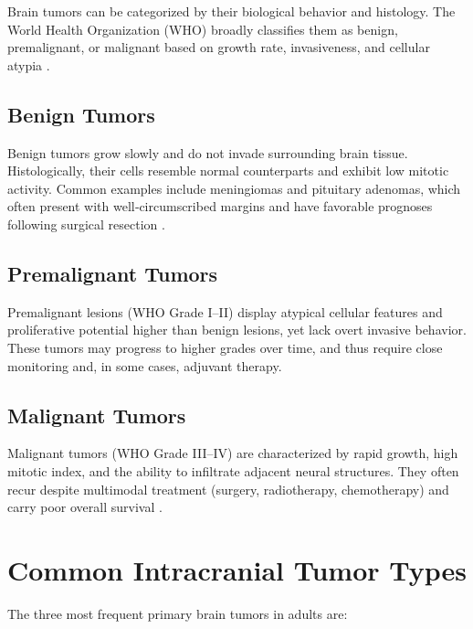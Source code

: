 Brain tumors can be categorized by their biological behavior and histology. The World Health Organization (WHO) broadly classifies them as benign, premalignant, or malignant based on growth rate, invasiveness, and cellular atypia \cite{ref8}.

\subsection{Benign Tumors}
Benign tumors grow slowly and do not invade surrounding brain tissue. Histologically, their cells resemble normal counterparts and exhibit low mitotic activity. Common examples include meningiomas and pituitary adenomas, which often present with well‐circumscribed margins and have favorable prognoses following surgical resection \cite{ref8}.

\subsection{Premalignant Tumors}
Premalignant lesions (WHO Grade I–II) display atypical cellular features and proliferative potential higher than benign lesions, yet lack overt invasive behavior. These tumors may progress to higher grades over time, and thus require close monitoring and, in some cases, adjuvant therapy.

\subsection{Malignant Tumors}
Malignant tumors (WHO Grade III–IV) are characterized by rapid growth, high mitotic index, and the ability to infiltrate adjacent neural structures. They often recur despite multimodal treatment (surgery, radiotherapy, chemotherapy) and carry poor overall survival \cite{ref8}.

\section{Common Intracranial Tumor Types}
\label{sec:common-tumor-types}

The three most frequent primary brain tumors in adults are:


